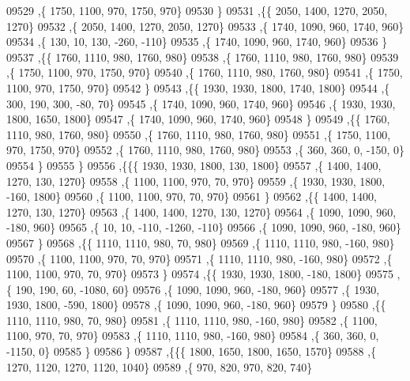 \begin{DoxyCode}
09529     ,\{  1750,  1100,   970,  1750,   970\}
09530     \}
09531    ,\{\{  2050,  1400,  1270,  2050,  1270\}
09532     ,\{  2050,  1400,  1270,  2050,  1270\}
09533     ,\{  1740,  1090,   960,  1740,   960\}
09534     ,\{   130,    10,   130,  -260,  -110\}
09535     ,\{  1740,  1090,   960,  1740,   960\}
09536     \}
09537    ,\{\{  1760,  1110,   980,  1760,   980\}
09538     ,\{  1760,  1110,   980,  1760,   980\}
09539     ,\{  1750,  1100,   970,  1750,   970\}
09540     ,\{  1760,  1110,   980,  1760,   980\}
09541     ,\{  1750,  1100,   970,  1750,   970\}
09542     \}
09543    ,\{\{  1930,  1930,  1800,  1740,  1800\}
09544     ,\{   300,   190,   300,   -80,    70\}
09545     ,\{  1740,  1090,   960,  1740,   960\}
09546     ,\{  1930,  1930,  1800,  1650,  1800\}
09547     ,\{  1740,  1090,   960,  1740,   960\}
09548     \}
09549    ,\{\{  1760,  1110,   980,  1760,   980\}
09550     ,\{  1760,  1110,   980,  1760,   980\}
09551     ,\{  1750,  1100,   970,  1750,   970\}
09552     ,\{  1760,  1110,   980,  1760,   980\}
09553     ,\{   360,   360,     0,  -150,     0\}
09554     \}
09555    \}
09556   ,\{\{\{  1930,  1930,  1800,   130,  1800\}
09557     ,\{  1400,  1400,  1270,   130,  1270\}
09558     ,\{  1100,  1100,   970,    70,   970\}
09559     ,\{  1930,  1930,  1800,  -160,  1800\}
09560     ,\{  1100,  1100,   970,    70,   970\}
09561     \}
09562    ,\{\{  1400,  1400,  1270,   130,  1270\}
09563     ,\{  1400,  1400,  1270,   130,  1270\}
09564     ,\{  1090,  1090,   960,  -180,   960\}
09565     ,\{    10,    10,  -110, -1260,  -110\}
09566     ,\{  1090,  1090,   960,  -180,   960\}
09567     \}
09568    ,\{\{  1110,  1110,   980,    70,   980\}
09569     ,\{  1110,  1110,   980,  -160,   980\}
09570     ,\{  1100,  1100,   970,    70,   970\}
09571     ,\{  1110,  1110,   980,  -160,   980\}
09572     ,\{  1100,  1100,   970,    70,   970\}
09573     \}
09574    ,\{\{  1930,  1930,  1800,  -180,  1800\}
09575     ,\{   190,   190,    60, -1080,    60\}
09576     ,\{  1090,  1090,   960,  -180,   960\}
09577     ,\{  1930,  1930,  1800,  -590,  1800\}
09578     ,\{  1090,  1090,   960,  -180,   960\}
09579     \}
09580    ,\{\{  1110,  1110,   980,    70,   980\}
09581     ,\{  1110,  1110,   980,  -160,   980\}
09582     ,\{  1100,  1100,   970,    70,   970\}
09583     ,\{  1110,  1110,   980,  -160,   980\}
09584     ,\{   360,   360,     0, -1150,     0\}
09585     \}
09586    \}
09587   ,\{\{\{  1800,  1650,  1800,  1650,  1570\}
09588     ,\{  1270,  1120,  1270,  1120,  1040\}
09589     ,\{   970,   820,   970,   820,   740\}

\end{DoxyCode}
